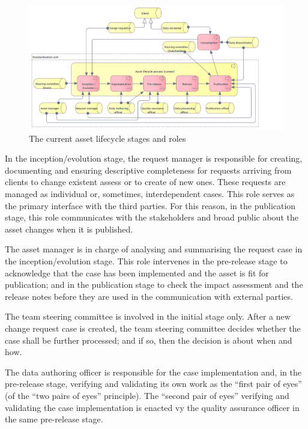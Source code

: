 	\begin{figure}[h]
		\centering
		\includegraphics[width=1.05\textwidth]{images/business/Lifecycle (current).png}
		\caption{The current asset lifecycle stages and roles}
		\label{fig:lifecycle-current}
	\end{figure} 
	
	In the inception/evolution stage, the request manager is responsible for creating, documenting and ensuring descriptive completeness for requests arriving from clients to change existent assess or to create of new ones. These requests are managed as individual or, sometimes, interdependent cases. This role serves as the primary interface with the third parties. For this reason, in the publication stage, this role communicates with the stakeholders and broad public about the asset changes when it is published.
	
	The asset manager is in charge of analysing and summarising the request case in the inception/evolution stage. This role intervenes in the pre-release stage to acknowledge that the case has been implemented and the asset is fit for publication; and in the publication stage to check the impact assessment and the release notes before they are used in the communication with external parties.
	
	The team steering committee is involved in the initial stage only. After a new change request case is created, the team steering committee decides whether the case shall be further processed; and if so, then the decision is about when and how.
	
	The data authoring officer is responsible for the case implementation and, in the pre-release stage, verifying and validating its own work as the ``first pair of eyes'' (of the ``two pairs of eyes'' principle). The ``second pair of eyes'' verifying and validating the case implementation is enacted vy the quality assurance officer in the same pre-release stage.
	
